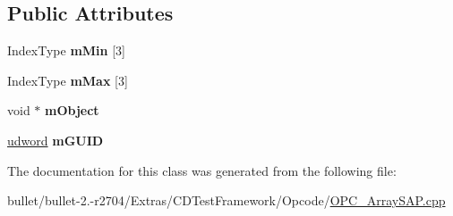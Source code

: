 \subsection*{Public Attributes}
\begin{DoxyCompactItemize}
\item 
\hypertarget{class_opcode_1_1_a_s_a_p___box_a7b72574e98e7197f28ec2925093c03ee}{Index\+Type {\bfseries m\+Min} \mbox{[}3\mbox{]}}\label{class_opcode_1_1_a_s_a_p___box_a7b72574e98e7197f28ec2925093c03ee}

\item 
\hypertarget{class_opcode_1_1_a_s_a_p___box_abc9884f311e1340c51b051ccd0fd8b0b}{Index\+Type {\bfseries m\+Max} \mbox{[}3\mbox{]}}\label{class_opcode_1_1_a_s_a_p___box_abc9884f311e1340c51b051ccd0fd8b0b}

\item 
\hypertarget{class_opcode_1_1_a_s_a_p___box_af2606f3e94dc8d0b0bf7ce7171ac7476}{void $\ast$ {\bfseries m\+Object}}\label{class_opcode_1_1_a_s_a_p___box_af2606f3e94dc8d0b0bf7ce7171ac7476}

\item 
\hypertarget{class_opcode_1_1_a_s_a_p___box_a5db7b0d8e26f922a24732adb39170fd0}{\hyperlink{_ice_types_8h_a44c6f1920ba5551225fb534f9d1a1733}{udword} {\bfseries m\+G\+U\+I\+D}}\label{class_opcode_1_1_a_s_a_p___box_a5db7b0d8e26f922a24732adb39170fd0}

\end{DoxyCompactItemize}


The documentation for this class was generated from the following file\+:\begin{DoxyCompactItemize}
\item 
bullet/bullet-\/2.-\/r2704/\+Extras/\+C\+D\+Test\+Framework/\+Opcode/\hyperlink{_o_p_c___array_s_a_p_8cpp}{O\+P\+C\+\_\+\+Array\+S\+A\+P.\+cpp}\end{DoxyCompactItemize}
